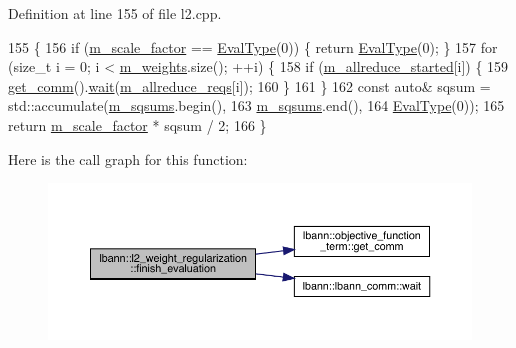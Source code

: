Definition at line 155 of file l2.\+cpp.


\begin{DoxyCode}
155                                                      \{
156   \textcolor{keywordflow}{if} (\hyperlink{classlbann_1_1objective__function__term_a59a544b8ff0455ed5091de3bf0d81c3c}{m\_scale\_factor} == \hyperlink{base_8hpp_a3266f5ac18504bbadea983c109566867}{EvalType}(0)) \{ \textcolor{keywordflow}{return} \hyperlink{base_8hpp_a3266f5ac18504bbadea983c109566867}{EvalType}(0); \}
157   \textcolor{keywordflow}{for} (\textcolor{keywordtype}{size\_t} i = 0; i < \hyperlink{classlbann_1_1objective__function__term_a1d601c29153ae9cb54c585887608f2bf}{m\_weights}.size(); ++i) \{
158     \textcolor{keywordflow}{if} (\hyperlink{classlbann_1_1l2__weight__regularization_a0ae4858adb3279c0019f5e0500bdcf4f}{m\_allreduce\_started}[i]) \{
159       \hyperlink{classlbann_1_1objective__function__term_a5f89b676a26a6b76ddc26563ac87beb9}{get\_comm}().\hyperlink{classlbann_1_1lbann__comm_a30439f28cf615e1406090799c5499321}{wait}(\hyperlink{classlbann_1_1l2__weight__regularization_adf7350e151736d9bae4aa5cf410acd80}{m\_allreduce\_reqs}[i]);
160     \}
161   \}
162   \textcolor{keyword}{const} \textcolor{keyword}{auto}& sqsum = std::accumulate(\hyperlink{classlbann_1_1l2__weight__regularization_a628aabb4e824f2aa861baba93668dc24}{m\_sqsums}.begin(),
163                                       \hyperlink{classlbann_1_1l2__weight__regularization_a628aabb4e824f2aa861baba93668dc24}{m\_sqsums}.end(),
164                                       \hyperlink{base_8hpp_a3266f5ac18504bbadea983c109566867}{EvalType}(0));
165   \textcolor{keywordflow}{return} \hyperlink{classlbann_1_1objective__function__term_a59a544b8ff0455ed5091de3bf0d81c3c}{m\_scale\_factor} * sqsum / 2;
166 \}
\end{DoxyCode}
Here is the call graph for this function\+:\nopagebreak
\begin{figure}[H]
\begin{center}
\leavevmode
\includegraphics[width=350pt]{classlbann_1_1l2__weight__regularization_a5517e1fa9da8a28f39cf208054f6138a_cgraph}
\end{center}
\end{figure}
